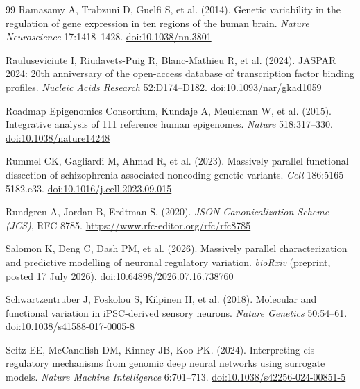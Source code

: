 \begin{thebibliography}{99}
 Ramasamy A, Trabzuni D, Guelfi S, et al. (2014). Genetic variability in the regulation of gene expression in ten regions of the human brain. \textit{Nature Neuroscience} 17:1418–1428. \href{https://doi.org/10.1038/nn.3801}{doi:10.1038/nn.3801}

 Rauluseviciute I, Riudavets-Puig R, Blanc-Mathieu R, et al. (2024). JASPAR 2024: 20th anniversary of the open-access database of transcription factor binding profiles. \textit{Nucleic Acids Research} 52:D174–D182. \href{https://doi.org/10.1093/nar/gkad1059}{doi:10.1093/nar/gkad1059}

 Roadmap Epigenomics Consortium, Kundaje A, Meuleman W, et al. (2015). Integrative analysis of 111 reference human epigenomes. \textit{Nature} 518:317–330. \href{https://doi.org/10.1038/nature14248}{doi:10.1038/nature14248}

 Rummel CK, Gagliardi M, Ahmad R, et al. (2023). Massively parallel functional dissection of schizophrenia-associated noncoding genetic variants. \textit{Cell} 186:5165–5182.e33. \href{https://doi.org/10.1016/j.cell.2023.09.015}{doi:10.1016/j.cell.2023.09.015}

 Rundgren A, Jordan B, Erdtman S. (2020). \textit{JSON Canonicalization Scheme (JCS)}, RFC 8785. \url{https://www.rfc-editor.org/rfc/rfc8785}

 Salomon K, Deng C, Dash PM, et al. (2026). Massively parallel characterization and predictive modelling of neuronal regulatory variation. \textit{bioRxiv} (preprint, posted 17 July 2026). \href{https://doi.org/10.64898/2026.07.16.738760}{doi:10.64898/2026.07.16.738760}

 Schwartzentruber J, Foskolou S, Kilpinen H, et al. (2018). Molecular and functional variation in iPSC-derived sensory neurons. \textit{Nature Genetics} 50:54–61. \href{https://doi.org/10.1038/s41588-017-0005-8}{doi:10.1038/s41588-017-0005-8}

 Seitz EE, McCandlish DM, Kinney JB, Koo PK. (2024). Interpreting cis-regulatory mechanisms from genomic deep neural networks using surrogate models. \textit{Nature Machine Intelligence} 6:701–713. \href{https://doi.org/10.1038/s42256-024-00851-5}{doi:10.1038/s42256-024-00851-5}


\end{thebibliography}
